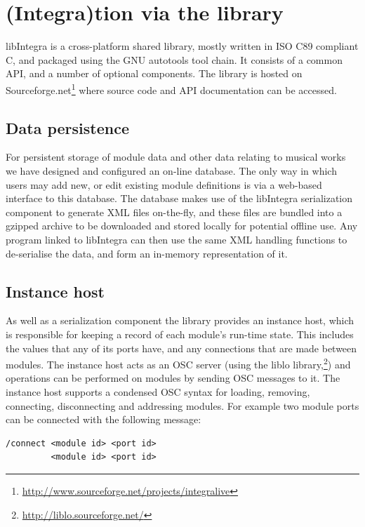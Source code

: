 \section{(Integra)tion via the library}\label{subsec:db_lib}

libIntegra is a cross-platform shared library, mostly written in ISO C89 compliant C, and packaged using the GNU autotools tool chain. It consists of a common API, and a number of optional components. The library is hosted on Sourceforge.net\footnote{\url{http://www.sourceforge.net/projects/integralive}} where source code and API documentation can be accessed.

\subsection{Data persistence}\label{subsec:serialization}

For persistent storage of module data and other data relating to
musical works we have designed and configured an on-line database. The
only way in which users may add new, or edit existing module
definitions is via a web-based interface to this database. The
database makes use of the libIntegra serialization component to
generate XML files on-the-fly, and these files are bundled into a
gzipped archive to be downloaded and stored locally for potential
offline use. Any program linked to libIntegra can then use the same
XML handling functions to de-serialise the data, and form an in-memory
representation of it.

\subsection{Instance host}\label{subsec:instance_host}

As well as a serialization component the library provides an instance
host, which is responsible for keeping a record of each module's
run-time state. This includes the values that any of its ports have,
and any connections that are made between modules. The instance host
acts as an OSC server (using the liblo
library,\footnote{\url{http://liblo.sourceforge.net/}}) and operations
can be performed on modules by sending OSC messages to it. The
instance host supports a condensed OSC syntax for loading, removing,
connecting, disconnecting and addressing modules. For example two
module ports can be connected with the following message:
\begin{verbatim}
/connect <module id> <port id> 
         <module id> <port id>
\end{verbatim}

